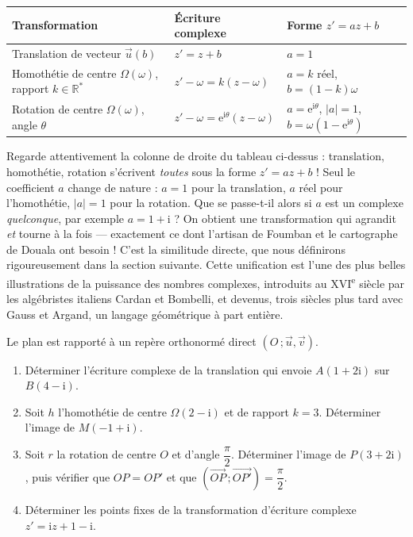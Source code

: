 \documentclass[11pt]{article}
\newcommand{\cle}[1]{{\popxbold\color{popdark}#1}}
\begin{document}
\begin{aretenir}
\begin{center}
\begin{tabularx}{\linewidth}{|l|X|X|}
\hline
\rowcolor{popblueL} \textbf{Transformation} & \textbf{Écriture complexe} & \textbf{Forme $z' = az + b$} \\
\hline
Translation de vecteur $\vec{u}(b)$ & $z' = z + b$ & $a = 1$ \\
\hline
Homothétie de centre $\Omega(\omega)$, rapport $k \in \mathbb{R}^*$ & $z' - \omega = k(z - \omega)$ & $a = k$ réel, $b = (1-k)\omega$ \\
\hline
Rotation de centre $\Omega(\omega)$, angle $\theta$ & $z' - \omega = \mathrm{e}^{\mathrm{i}\theta}(z - \omega)$ & $a = \mathrm{e}^{\mathrm{i}\theta}$, $|a| = 1$, $b = \omega(1 - \mathrm{e}^{\mathrm{i}\theta})$ \\
\hline
\end{tabularx}
\end{center}
\end{aretenir}

\begin{savaistu}
Regarde attentivement la colonne de droite du tableau ci-dessus : translation, homothétie, rotation s'écrivent \emph{toutes} sous la forme $z' = az + b$ ! Seul le coefficient $a$ change de nature : $a = 1$ pour la translation, $a$ réel pour l'homothétie, $|a| = 1$ pour la rotation. Que se passe-t-il alors si $a$ est un complexe \emph{quelconque}, par exemple $a = 1 + \mathrm{i}$ ? On obtient une transformation qui agrandit \emph{et} tourne à la fois — exactement ce dont l'artisan de Foumban et le cartographe de Douala ont besoin ! C'est la \cle{similitude directe}, que nous définirons rigoureusement dans la section suivante. Cette unification est l'une des plus belles illustrations de la puissance des nombres complexes, introduits au XVI\textsuperscript{e} siècle par les algébristes italiens Cardan et Bombelli, et devenus, trois siècles plus tard avec Gauss et Argand, un langage géométrique à part entière.
\end{savaistu}

\begin{exercice}
Le plan est rapporté à un repère orthonormé direct $(O\,;\vec{u},\vec{v})$.
\begin{enumerate}
\item Déterminer l'écriture complexe de la translation qui envoie $A(1 + 2\mathrm{i})$ sur $B(4 - \mathrm{i})$.
\item Soit $h$ l'homothétie de centre $\Omega(2 - \mathrm{i})$ et de rapport $k = 3$. Déterminer l'image de $M(-1 + \mathrm{i})$.
\item Soit $r$ la rotation de centre $O$ et d'angle $\dfrac{\pi}{2}$. Déterminer l'image de $P(3 + 2\mathrm{i})$, puis vérifier que $OP = OP'$ et que $(\overrightarrow{OP}\,;\overrightarrow{OP'}) = \dfrac{\pi}{2}$.
\item Déterminer les points fixes de la transformation d'écriture complexe $z' = \mathrm{i}z + 1 - \mathrm{i}$.
\end{enumerate}
\end{exercice}
\end{document}
